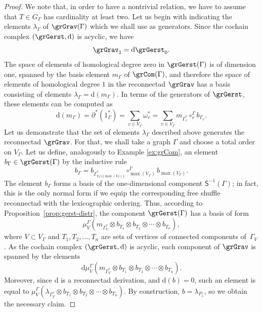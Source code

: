 \begin{proof}
We note that, in order to have a nontrivial relation, we have to assume that $T\in G_\Gamma$ has cardinality at least two. Let us begin with indicating the elements $\lambda_{\Gamma}$ of $\grGrav(\Gamma)$ which we shall use as generators. Since the cochain complex $(\grGerst, \mathrm{d})$ is acyclic, we have 
 \[
\grGrav_1=\mathrm{d}\grGerst_0.
 \] 
The space of elements of homological degree zero in $\grGerst(\Gamma)$ is of dimension one, spanned by the basis element $m_\Gamma$ of $\grCom(\Gamma)$, and therefore the space of elements of homological degree $1$ in the reconnectad $\grGrav$ has a basis consisting of elements $\lambda_{\Gamma}=\mathrm{d}(m_{\Gamma})$. In terms of the generators of $\grGerst$, these elements can be computed as
 \[
\mathrm{d}(m_{\Gamma})=\partial^{*}(1^*_{\Gamma})=\sum_{v\in V_\Gamma} \omega_v^*=\sum_{v\in V_\Gamma} m_{\Gamma^*_v} \circ_v^\Gamma b_{\Gamma_v}.
 \]
Let us demonstrate that the set of elements $\lambda_{\Gamma}$ described above generates the reconnectad $\grGrav$. For that, we shall take a graph $\Gamma$ and choose a total order on $V_\Gamma$. Let us define, analogously to Example \ref{ex:grCom}, an element $b_\Gamma \in \grGerst(\Gamma)$ by the inductive rule 
 \[
b_\Gamma = b_{\Gamma^*_{V_\Gamma\setminus\{\max(V_\Gamma)\}}}\circ_{\max(V_\Gamma)}^{\Gamma} b_{\max(V_\Gamma)}.
 \]
The element $b_\Gamma$ forms a basis of the one-dimensional component $\mathsf{S}^{-1}(\Gamma)$; in fact, this is the only normal form if we equip the corresponding free shuffle reconnectad with the lexicographic ordering. Thus, according to Proposition~\ref{prop:gerst-distr}, the component $\grGerst(\Gamma)$ has a basis of form  
 \[
\mu_V^\Gamma(m_{\Gamma^*_V}\otimes b_{T_1}\otimes b_{T_2}\otimes\cdots\otimes b_{T_n}),
 \]
where $V\subset V_\Gamma$ and $T_1,T_2,\ldots,T_n$ are sets of vertices of connected components of~$\Gamma_V$. As the cochain complex $(\grGerst, \mathrm{d})$ is acyclic, each component of $\grGrav$ is spanned by the elements 
 \[
\mathrm{d}\mu_V^\Gamma(m_{\Gamma^*_V}\otimes b_{T_1}\otimes b_{T_2}\otimes\cdots\otimes b_{T_n}).
 \]
Moreover, since $\mathrm{d}$ is a reconnectad derivation, and $\mathrm{d}(b)=0$, such an element is equal to $\mu_V^\Gamma(\lambda_{\Gamma^*_V}\otimes b_{T_1}\otimes b_{T_2}\otimes\cdots\otimes b_{T_n})$.
By construction, $b=\lambda_{P_1}$, so we obtain the necessary claim. 


\end{proof}

